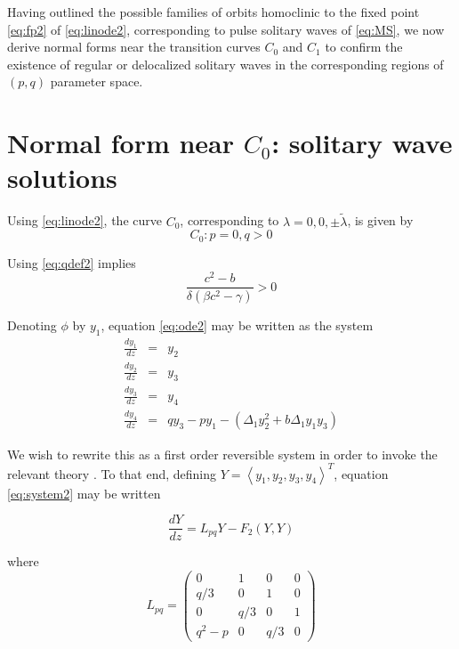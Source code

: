 Having outlined the possible families of orbits homoclinic to the fixed point \eqref{eq:fp2} of \eqref{eq:linode2},
corresponding to pulse solitary waves of \eqref{eq:MS}, we now derive normal forms near the transition curves $C_0$ and $C_1$
to confirm the existence of regular or delocalized solitary waves in the corresponding regions of $\left(p,q\right)$ parameter space.

\section{Normal form near $C_0$: solitary wave solutions}

Using \eqref{eq:linode2}, the curve $C_0$, corresponding to $\lambda = 0,0,\pm \tilde{ \lambda } $, is given by
\begin{equation}
C_0: { p=0, q > 0 }
\end{equation}

Using \eqref{eq:qdef2} implies
\begin{equation}
 \frac{c^2 - b}{\delta\left(\beta c^2 - \gamma\right)} > 0
\end{equation}

Denoting $\phi$ by $y_1$, equation \eqref{eq:ode2} may be written as the system
\begin{subequations}\label{eq:system2}
\begin{eqnarray}
\frac{d y_1 }{d z} &=& y_2 \\
\frac{d y_2 }{d z} &=& y_3 \\
\frac{d y_3 }{d z} &=& y_4 \\
\frac{d y_4 }{d z} &=& q y_3 - p y_1 - \left(\Delta_1 y_2^2 + b \Delta_1 y_1 y_3 \right)
\end{eqnarray}
\end{subequations}

We wish to rewrite this as a first order reversible system in order to invoke the relevant theory \cite{IA}. 
To that end, defining  $Y=\left<y_1,y_2,y_3,y_4\right>^T$, equation \eqref{eq:system2} may be written 

\begin{equation}\label{eq:bilinearms}
\frac{ dY }{ dz } = L_{pq} Y - F_2(Y,Y)
\end{equation}

where 
\begin{equation}
L_{pq} = \left( 
\begin{array}{cccc}
0&1&0&0\\
q/3&0&1&0\\
0&q/3&0&1\\
q^2 - p &0&q/3&0 \end{array} \right) \end{equation}

